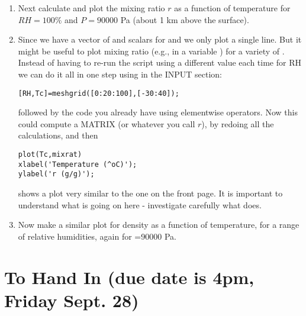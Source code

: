 \documentclass[letterpaper]{article}
\begin{document}
\begin{enumerate}
\item Next calculate and plot the mixing ratio $r$ as a function of temperature for $RH=100\%$
and $P=90000$ Pa (about 1 km above the surface).

\item Since we have a vector of  and scalars for  and  we only
plot a single line. But it might be useful to plot mixing ratio (e.g., in a variable ) for a variety of
. Instead of having to re-run the script using a different value 
each time for RH we can do it all in one step using   in the INPUT section:
\begin{lstlisting}
[RH,Tc]=meshgrid([0:20:100],[-30:40]);
\end{lstlisting}
followed by the code you already have using elementwise operators.
Now this could compute a MATRIX  (or whatever you call $r$), by redoing all the calculations, and then
\begin{lstlisting}
plot(Tc,mixrat)
xlabel('Temperature (^oC)');
ylabel('r (g/g)');
\end{lstlisting}
shows a plot very similar to the one on the front page. It is important to
understand what is going on here - investigate carefully 
what  does.

\item Now make a similar plot for density as a function of temperature, for a range
of relative humidities, again for =90000 Pa.


\end{enumerate}



\section{To Hand In (due date is 4pm, Friday Sept. 28)}
\end{document}
